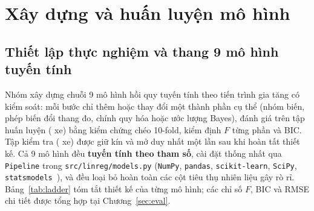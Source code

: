 \section{Xây dựng và huấn luyện mô hình}
\label{sec:models}

\subsection{Thiết lập thực nghiệm và thang 9 mô hình tuyến tính}
Nhóm xây dựng chuỗi 9 mô hình hồi quy tuyến tính theo tiến trình gia tăng có kiểm soát: mỗi bước chỉ thêm hoặc thay đổi một thành phần cụ thể (nhóm biến, phép biến đổi thang đo, chính quy hóa hoặc ước lượng Bayes), đánh giá trên tập huấn luyện (\nTrain{} xe) bằng kiểm chứng chéo 10-fold, kiểm định $F$ từng phần và BIC. Tập kiểm tra (\nTest{} xe) được giữ kín và mở duy nhất một lần sau khi hoàn tất thiết kế. Cả 9 mô hình đều \textbf{tuyến tính theo tham số}, cài đặt thống nhất qua \texttt{Pipeline} trong \texttt{src/linreg/models.py} (\texttt{NumPy}, \texttt{pandas}, \texttt{scikit-learn}, \texttt{SciPy}, \texttt{statsmodels}~\cite{harris2020numpy, mckinney2010pandas, pedregosa2011sklearn, virtanen2020scipy, seabold2010statsmodels}), và đều loại bỏ hoàn toàn các cột tiêu thụ nhiên liệu gây rò rỉ. Bảng~\ref{tab:ladder} tóm tắt thiết kế của từng mô hình; các chỉ số $F$, BIC và RMSE chi tiết được tổng hợp tại Chương~\ref{sec:eval}.

